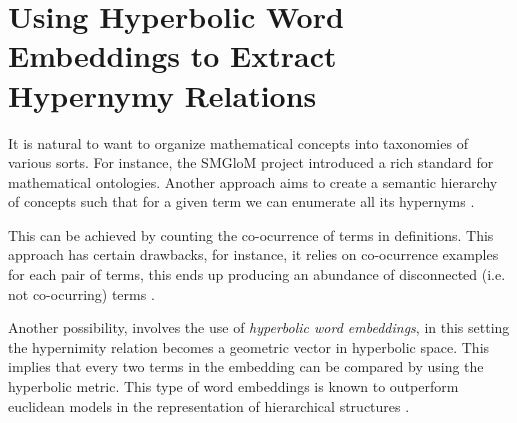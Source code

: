 \documentclass[submission,copyright,creativecommons]{eptcs}
\begin{document}

\section{Using Hyperbolic Word Embeddings to Extract Hypernymy Relations}
It is natural to want to organize mathematical concepts into taxonomies of various sorts.
For instance, the SMGloM project \cite{ginev2016smglom} introduced a rich standard for mathematical ontologies. Another approach aims to create a semantic hierarchy of concepts such that for a given term we can enumerate all its hypernyms \cite{wang-etal-2017-short}.

This can be  achieved by counting the co-ocurrence \cite{hearst-1992-automatic} of terms in definitions. This approach has certain drawbacks, for instance, it relies on co-ocurrence examples for each pair of terms, this ends up producing an abundance of disconnected (i.e. not co-ocurring) terms \cite{aly-etal-2019-every}.

Another possibility, involves the use of \emph{hyperbolic word embeddings}, in this setting the hypernimity relation becomes a geometric vector in hyperbolic space. This implies that every two terms in the embedding can be compared by using the hyperbolic metric.
This type of word embeddings is known to outperform euclidean models in the representation of hierarchical structures \cite{facebookembeds}.
\end{document}
